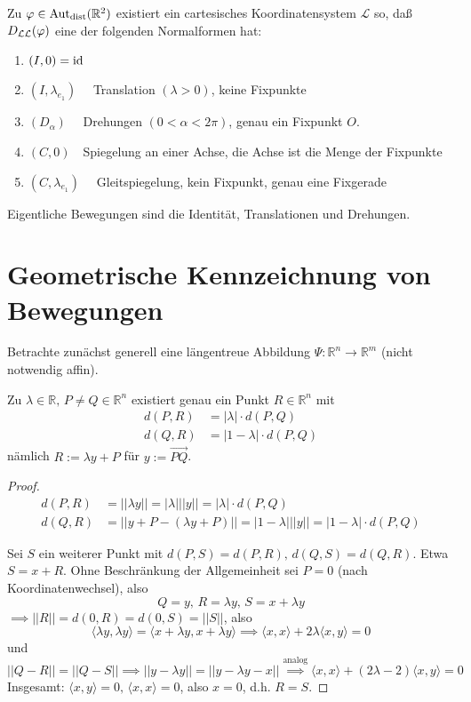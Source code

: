 \documentclass[parskip,a4paper,twoside,DIV15,BCOR12mm]{scrbook}
\begin{document}
\begin{theo}
Zu \(\varphi\in\operatorname{Aut_{dist}}(\mathbb{R}^{2})\) existiert ein cartesisches 
Koordinatensystem \(\mathcal{L}\) so, da\ss \ \(D_{\mathcal{L}\mathcal{L}}(\varphi)\)
eine der folgenden Normalformen hat:
\begin{enumerate}
\item\((I,0) = \operatorname{id}\)
\item\((I,\lambda_{e_{1}})\quad\) Translation \((\lambda > 0)\), keine Fixpunkte
\item\((D_{\alpha})\quad\) Drehungen \((0<\alpha<2\pi)\), genau ein Fixpunkt 
\(O\).
\item\((C,0)\quad\)Spiegelung an einer Achse, die Achse ist die Menge der 
Fixpunkte
\item\((C,\lambda_{e_{1}})\quad\) Gleitspiegelung, kein Fixpunkt, genau eine
Fixgerade
\end{enumerate}
Eigentliche Bewegungen sind die Identit\"at, Translationen und Drehungen.
\end{theo}

\section{Geometrische Kennzeichnung von Bewegungen}

Betrachte zun\"achst generell eine l\"angentreue Abbildung 
\(\Psi:\mathbb{R}^{n}\to\mathbb{R}^{m}\) (nicht notwendig affin).
\begin{lemma}
Zu \(\lambda\in\mathbb{R},\,P\neq Q\in\mathbb{R}^{n}\) existiert genau ein
Punkt \(R\in\mathbb{R}^{n}\) mit
\begin{align*}
d(P,R)&=|\lambda|\cdot d(P,Q)\\
d(Q,R)&=|1-\lambda|\cdot d(P,Q)
\end{align*}
n\"amlich \(R:=\lambda y+P\) f\"ur \(y:=\overrightarrow{PQ}\).
\end{lemma}
\begin{proof}
\begin{align*}
d(P,R)&=||\lambda y|| = |\lambda|||y||=|\lambda|\cdot d(P,Q)\\
d(Q,R)&=||y+P-(\lambda y + P)||=|1-\lambda|||y||=|1-\lambda|\cdot d(P,Q)
\end{align*}

Sei \(S\) ein weiterer Punkt mit \(d(P,S)=d(P,R),\,d(Q,S)=d(Q,R)\). Etwa
\(S=x+R\).
Ohne Beschr\"ankung der Allgemeinheit sei \(P=0\) (nach Koordinatenwechsel),
also
\[
Q=y,\,R=\lambda y,\,S=x+\lambda y
\]
\(\implies ||R||=d(0,R)=d(0,S)=||S||\), also 
\[
\langle\lambda y,\lambda y\rangle = \langle x+\lambda y,x+\lambda y\rangle
\implies\langle x,x\rangle+2\lambda\langle x,y\rangle =0
\]
und
\[
||Q-R||=||Q-S||\implies ||y-\lambda y||=||y-\lambda y-x|| 
\overset{\text{analog}}{\implies}
\langle x,x\rangle+(2\lambda -2)\langle x,y\rangle =0
\]
Insgesamt: \(\langle x,y\rangle =0,\,\langle x,x\rangle=0\), also \(x=0\), d.h.
\(R=S\).
\end{proof}
\end{document}

